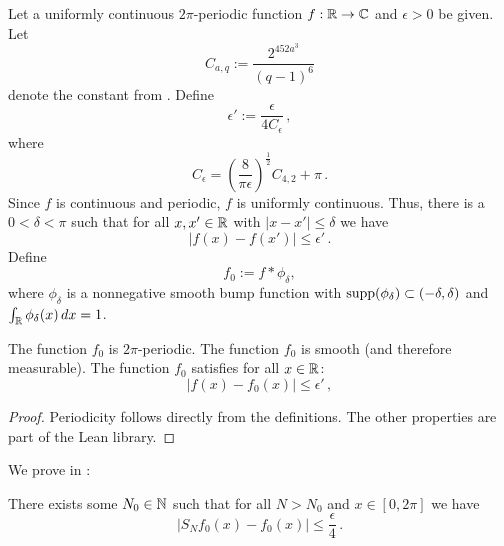 Let a uniformly continuous $2\pi$-periodic function $f:{\mathbb{R}}\to \mathbb{C}$ and $\epsilon>0$ be given.
Let
\begin{equation}
    C_{a,q} := \frac{2^{452a^3}}{(q-1)^6}
\end{equation}
denote the constant from .
Define
\begin{equation}
    \epsilon' := \frac {\epsilon} {4 C_\epsilon} \,,
\end{equation}
where
\begin{equation*}
    C_\epsilon = \left(\frac{8}{\pi\epsilon}\right)^\frac{1}{2} C_{4,2} + \pi \,.
\end{equation*}
Since $f$ is continuous and periodic, $f$ is uniformly continuous.
Thus, there is a $0<\delta<\pi$
such that for all $x,x' \in {\mathbb{R}}$ with $|x-x'|\le \delta$
we have
\begin{equation}\label{uniconbound}
|f(x)-f(x')|\le \epsilon' \, .
\end{equation}
Define
\begin{equation}\label{def-fzero}
f_0:=f \ast \phi_\delta,
\end{equation}
where $\phi_\delta$ is a nonnegative smooth bump function with $\operatorname{\operatorname{supp}} (\phi_\delta) \subset (-\delta, \delta)$ and $\int _{\mathbb{R}} \phi_\delta (x) \, dx = 1$.

\begin{lemma}
\label{smooth-approximation}
\leanok
{}
    The function $f_0$ is $2\pi$-periodic.
    The function $f_0$ is smooth (and therefore measurable).
    The function $f_0$ satisfies for all $x\in {\mathbb{R}}$:
    \begin{equation}\label{eq-ffzero}
    |f(x)-f_0(x)|\le \epsilon' \, ,
    \end{equation}
\end{lemma}

\begin{proof}
    \leanok
    Periodicity follows directly from the definitions. The other properties are part of the Lean library.
\end{proof}

We prove in :
\begin{lemma}
\label{convergence-for-smooth}
\leanok
    There exists some $N_0 \in {\mathbb{N}}$ such that for all $N>N_0$ and $x\in [0,2\pi]$ we have
    \begin{equation}
        |S_N f_0 (x)- f_0(x)|\le \frac \epsilon 4\, .
    \end{equation}
\end{lemma}

